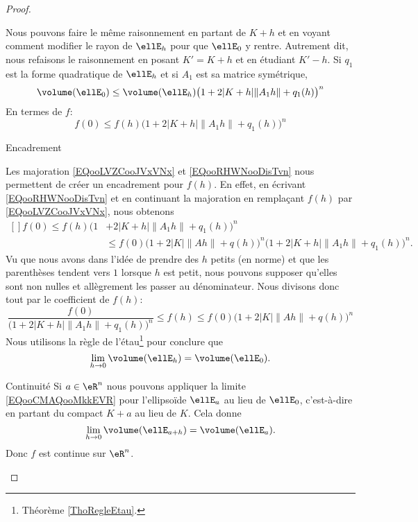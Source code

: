 \begin{proof}
\begin{subproof}
		Nous pouvons faire le même raisonnement en partant de \( K+h\) et en voyant comment modifier le rayon de \( \ellE_h\) pour que \( \ellE_0\) y rentre. Autrement dit, nous refaisons le raisonnement en posant \( K'=K+h\) et en étudiant \( K'-h\). Si \( q_1\) est la forme quadratique de \( \ellE_h\) et si \( A_1\) est sa matrice symétrique,
		\begin{equation}
			\volume(\ellE_0)\leq \volume(\ellE_h)\big( 1+2| K+h |\| A_1h \|+q_1(h) \big)^n
		\end{equation}
		En termes de \( f\):
		\begin{equation}        \label{EQooRHWNooDisTvn}
			f(0)\leq f(h) \big( 1+2| K+h |\| A_1h \|+q_1(h) \big)^n
		\end{equation}
		\item[Encadrement]

		Les majoration \eqref{EQooLVZCooJVxVNx} et \eqref{EQooRHWNooDisTvn} nous permettent de créer un encadrement pour \( f(h)\). En effet, en écrivant \eqref{EQooRHWNooDisTvn} et en continuant la majoration en remplaçant \( f(h)\) par \eqref{EQooLVZCooJVxVNx}, nous obtenons
		\begin{equation}
			\begin{aligned}[]
				f(0)\leq f(h) \big( 1 & +2| K+h |\| A_1h \|+q_1(h) \big)^n                                                      \\
				                      & \leq f(0)\big( 1+2| K |\| Ah \|+q(h) \big)^n \big( 1+2| K+h |\| A_1h \|+q_1(h) \big)^n.
			\end{aligned}
		\end{equation}
		Vu que nous avons dans l'idée de prendre des \( h\) petits (en norme) et que les parenthèses tendent vers \( 1\) lorsque \( h\) est petit, nous pouvons supposer qu'elles sont non nulles et allègrement les passer au dénominateur. Nous divisons donc tout par le coefficient de \( f(h)\):
		\begin{equation}
			\frac{ f(0) }{  \big( 1+2| K+h |\| A_1h \|+q_1(h) \big)^n }\leq f(h)\leq f(0)  \big( 1+2| K |\| Ah \|+q(h) \big)^n
		\end{equation}
		Nous utilisons la règle de l'étau\footnote{Théorème \ref{ThoRegleEtau}.} pour conclure que
		\begin{equation}        \label{EQooCMAQooMkkEVR}
			\lim_{h\to 0} \volume(\ellE_h)=\volume(\ellE_0).
		\end{equation}
		\item[Continuité]
		Si \( a\in \eR^n\) nous pouvons appliquer la limite \eqref{EQooCMAQooMkkEVR} pour l'ellipsoïde \( \ellE_a\) au lieu de \( \ellE_0\), c'est-à-dire en partant du compact \( K+a\) au lieu de \( K\). Cela donne
		\begin{equation}
			\lim_{h\to 0} \volume(\ellE_{a+h})=\volume(\ellE_a).
		\end{equation}
		Donc \( f\) est continue sur \( \eR^n\).


\end{subproof}
\end{proof}
